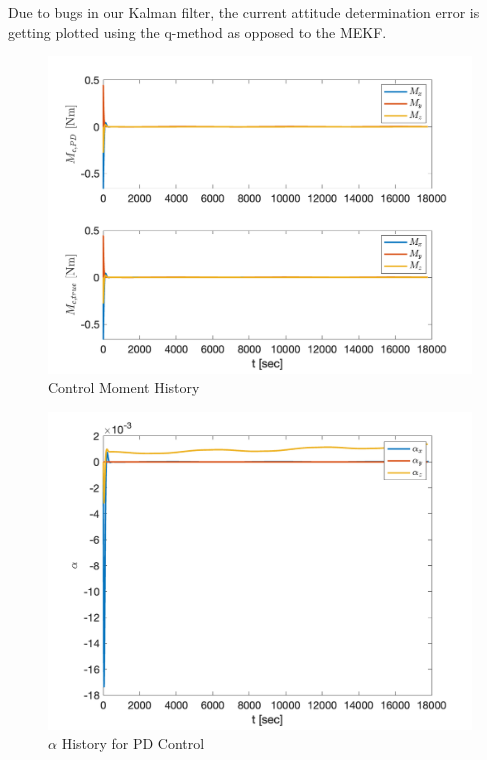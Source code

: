 Due to bugs in our Kalman filter, the current attitude determination error is getting plotted using the q-method as opposed to the MEKF.

\begin{figure}[H]
    \centering
    \captionsetup{ justification = centering }
    \includegraphics[width = 15cm]{Images/PS9/control_moment_history.png}
    \caption{Control Moment History}
    \label{fig:ControlMomentHistory}
\end{figure}

\begin{figure}[H]
    \centering
    \captionsetup{ justification = centering }
    \includegraphics[width = 15cm]{Images/PS9/alpha_history_PD_control.png}
    \caption{$\alpha$ History for PD Control}
    \label{fig:PDAlpha}
\end{figure}